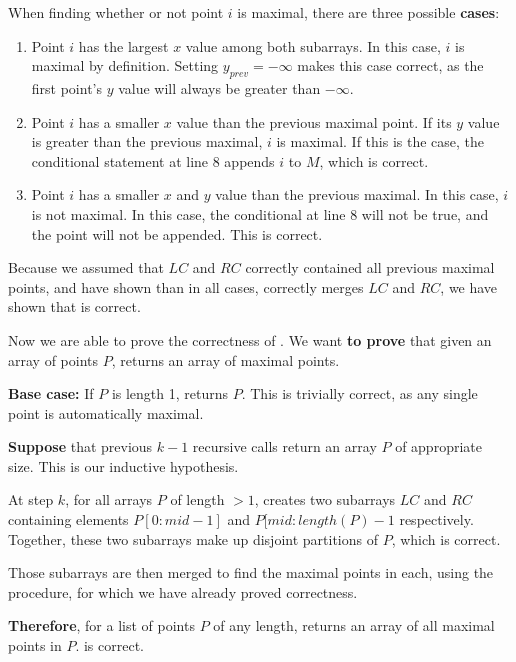 \documentclass[11pt]{article}
\begin{document}
When finding whether or not point $i$ is maximal, there are three possible
\textbf{cases}:
\begin{enumerate}
    \item Point $i$ has the largest $x$ value among both subarrays. In this case,
        $i$ is maximal by definition. Setting $y_{prev} = -\infty$ makes this
        case correct, as the first point's $y$ value will always be greater
        than $-\infty$.
    \item Point $i$ has a smaller $x$ value than the previous maximal point. If
        its $y$ value is greater than the previous maximal, $i$ is maximal. If
        this is the case, the conditional statement at line 8 appends $i$ to
        $M$, which is correct.
    \item Point $i$ has a smaller $x$ and $y$ value than the previous maximal.
        In this case, $i$ is not maximal. In this case, the conditional at line
        8 will not be true, and the point will not be appended. This is correct.
\end{enumerate}

Because we assumed that $LC$ and $RC$ correctly contained all previous maximal
points, and have shown than in all cases,  correctly 
merges $LC$ and $RC$, we have shown that  is correct.

Now we are able to prove the correctness of . We want
\textbf{to prove} that given an array of points $P$,  returns
an array of maximal points.

\textbf{Base case:} If $P$ is length 1,  returns $P$. This is
trivially correct, as any single point is automatically maximal.

\textbf{Suppose} that previous $k-1$ recursive calls return an array $P$ of
appropriate size. This is our inductive hypothesis.

At step $k$, for all arrays $P$ of length $>1$,  creates two
subarrays $LC$ and $RC$ containing elements $P[0:mid-1]$ and $P[mid:length(P)
-1$ respectively. Together, these two subarrays make up disjoint partitions of
$P$, which is correct.

Those subarrays are then merged to find the maximal points in each, using the
 procedure, for which we have already proved correctness.

\textbf{Therefore}, for a list of points $P$ of any length, 
returns an array of all maximal points in $P$.  is correct.
\end{document}
